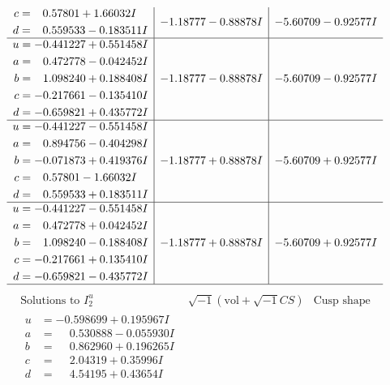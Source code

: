 \documentclass[1p]{elsarticle_modified}
\theoremstyle{definition}
\newcommand{\I}{\sqrt{-1}}
\begin{document}
$$\begin{array}{c|c|c}
\begin{aligned}
c &= \phantom{-}0.57801 + 1.66032 I \\
d &= \phantom{-}0.559533 - 0.183511 I\end{aligned}
 & -1.18777 - 0.88878 I & -5.60709 - 0.92577 I \\ \hline\begin{aligned}
u &= -0.441227 + 0.551458 I \\
a &= \phantom{-}0.472778 - 0.042452 I \\
b &= \phantom{-}1.098240 + 0.188408 I \\
c &= -0.217661 - 0.135410 I \\
d &= -0.659821 + 0.435772 I\end{aligned}
 & -1.18777 - 0.88878 I & -5.60709 - 0.92577 I \\ \hline\begin{aligned}
u &= -0.441227 - 0.551458 I \\
a &= \phantom{-}0.894756 - 0.404298 I \\
b &= -0.071873 + 0.419376 I \\
c &= \phantom{-}0.57801 - 1.66032 I \\
d &= \phantom{-}0.559533 + 0.183511 I\end{aligned}
 & -1.18777 + 0.88878 I & -5.60709 + 0.92577 I \\ \hline\begin{aligned}
u &= -0.441227 - 0.551458 I \\
a &= \phantom{-}0.472778 + 0.042452 I \\
b &= \phantom{-}1.098240 - 0.188408 I \\
c &= -0.217661 + 0.135410 I \\
d &= -0.659821 - 0.435772 I\end{aligned}
 & -1.18777 + 0.88878 I & -5.60709 + 0.92577 I\\
 \hline 
 \end{array}$$\newpage$$\begin{array}{c|c|c}  
\text{Solutions to }I^u_{2}& \I (\text{vol} + \sqrt{-1}CS) & \text{Cusp shape}\\
 \hline 
\begin{aligned}
u &= -0.598699 + 0.195967 I \\
a &= \phantom{-}0.530888 - 0.055930 I \\
b &= \phantom{-}0.862960 + 0.196265 I \\
c &= \phantom{-}2.04319 + 0.35996 I \\
d &= \phantom{-}4.54195 + 0.43654 I\end{aligned}

\end{array}$$
\end{document}

